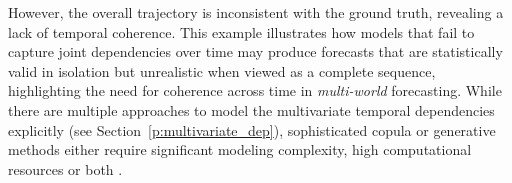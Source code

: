 \documentclass[a4paper,oneside,bibliography=totoc]{scrbook}
\begin{document}
However, the overall trajectory is inconsistent with the ground truth, revealing a lack of temporal coherence. This example illustrates how models that fail to capture joint dependencies over time may produce forecasts that are statistically valid in isolation but unrealistic when viewed as a complete sequence, highlighting the need for coherence across time in \textit{multi-world} forecasting.
While there are multiple approaches to model the multivariate temporal dependencies explicitly (see Section~\ref{p:multivariate_dep}), sophisticated copula or generative methods either require significant modeling complexity, high computational resources or both \cite{salinas_high-dimensional_2019, drouin_tactis_2022, ashok_tactis-2_2023, li_transformer-modulated_2023, yan_probabilistic_2024}. 
\end{document}
